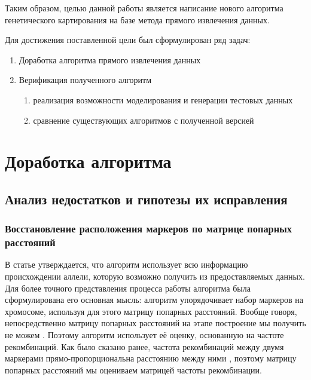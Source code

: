 \documentclass{matmex-diploma-custom}
\begin{document}
Таким образом, целью данной работы является написание нового алгоритма
генетического картирования на базе метода прямого извлечения данных.

\bigskip

Для достижения поставленной цели был сформулирован ряд задач:

\begin{enumerate}
\item Доработка алгоритма прямого извлечения данных
\item Верификация полученного алгоритм
  \begin{enumerate}
  \item реализация возможности моделирования и генерации тестовых
    данных
  \item сравнение существующих алгоритмов с полученной версией
  \end{enumerate}
\end{enumerate}

\section{Доработка алгоритма}

\subsection{Анализ недостатков и гипотезы их исправления}

\subsubsection{Восстановление расположения маркеров по матрице
  попарных расстояний}

В статье \cite{sysoev} утверждается, что алгоритм использует всю
информацию происхождении аллели, которую возможно получить из
предоставляемых данных. Для более точного представления процесса
работы алгоритма была сформулирована его основная мысль: алгоритм
упорядочивает набор маркеров на хромосоме, используя для этого матрицу
попарных расстояний. Вообще говоря, непосредственно матрицу попарных
расстояний на этапе построение мы получить не можем
\cite{bohonak2002ibd}. Поэтому алгоритм использует её оценку,
основанную на частоте рекомбинаций. Как было сказано ранее, частота
рекомбинаций между двумя маркерами прямо-пропорциональна расстоянию
между ними \cite{stam1993construction}, поэтому матрицу попарных
расстояний мы оцениваем матрицей частоты рекомбинации.
\end{document}
